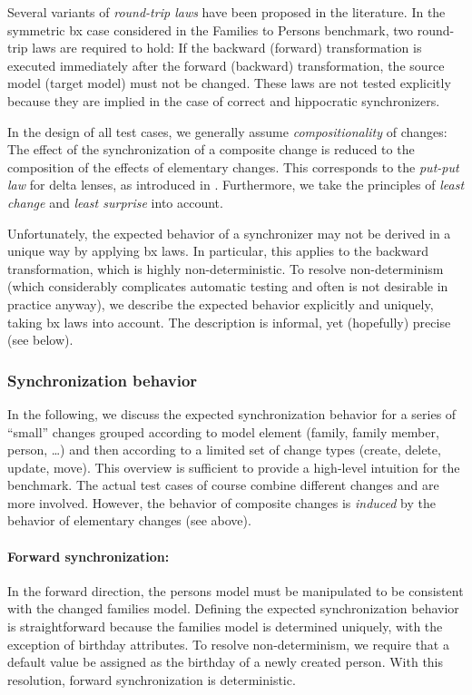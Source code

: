 Several variants of \emph{round-trip laws} have been proposed in the literature.
In the symmetric bx case considered in the Families to Persons benchmark, two round-trip laws are required to hold: If the backward (forward) transformation is executed immediately after the forward (backward) transformation, the source model (target model) must not be changed.
These laws are not tested explicitly because they are implied in the case of correct and hippocratic synchronizers.

In the design of all test cases, we generally assume \emph{compositionality} of changes: The effect of the synchronization of a composite change is reduced to the composition of the effects of elementary changes. This corresponds to the \emph{put-put law} for delta lenses, as introduced in \cite{JOT:issue_2011_01/article6}. Furthermore, we take the principles of \emph{least change} and \emph{least surprise} into account.

Unfortunately, the expected behavior of a synchronizer may not be derived in a unique way by applying bx laws. In particular, this applies to the backward transformation, which is highly non-deterministic. To resolve non-determinism (which considerably complicates automatic testing and often is not desirable in practice anyway), we describe the expected behavior explicitly and uniquely, taking bx laws into account. The description is informal, yet (hopefully) precise (see below). 


\subsubsection{Synchronization behavior}      

In the following, we discuss the expected synchronization behavior for a series of ``small'' changes grouped according to model element (family, family member, person, \ldots) and then according to a limited set of change types (create, delete, update, move).
This overview is sufficient to provide a high-level intuition for the benchmark.
The actual test cases of course combine different changes and are more involved. However, the behavior of composite changes is \emph{induced} by the behavior of elementary changes (see above).

\paragraph{Forward synchronization:}

In the forward direction, the persons model must be manipulated to be consistent with the changed families model.
Defining the expected synchronization behavior is straightforward because the families model is determined uniquely, with the exception of birthday attributes.
To resolve non-determinism, we require that a default value be assigned as the birthday of a newly created person.
With this resolution, forward synchronization is deterministic.

